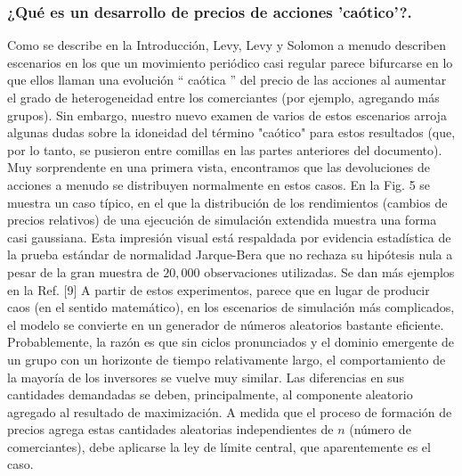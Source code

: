 \documentclass[12pt,a4paper]{article}
\begin{document}
\subsubsection*{¿Qué es un desarrollo de precios de acciones 'caótico'?.}
\quad Como se describe en la Introducción, Levy, Levy y Solomon a menudo describen escenarios en los que un movimiento periódico casi regular parece bifurcarse en lo que ellos llaman una evolución `` caótica '' del precio de las acciones al aumentar el grado de heterogeneidad entre los comerciantes (por ejemplo, agregando más grupos). Sin embargo, nuestro nuevo examen de varios de estos escenarios arroja algunas dudas sobre la idoneidad del término "caótico" para estos resultados (que, por lo tanto, se pusieron entre comillas en las partes anteriores del documento). Muy sorprendente en una primera vista, encontramos que las devoluciones de acciones a menudo se distribuyen normalmente en estos casos. En la Fig. 5 se muestra un caso típico, en el que la distribución de los rendimientos (cambios de precios relativos) de una ejecución de simulación extendida muestra una forma casi gaussiana. Esta impresión visual está respaldada por evidencia estadística de la prueba estándar de normalidad Jarque-Bera que no rechaza su hipótesis nula a pesar de la gran muestra de $ 20,000 $ observaciones utilizadas. Se dan más ejemplos en la Ref. [9] A partir de estos experimentos, parece que en lugar de producir caos (en el sentido matemático), en los escenarios de simulación más complicados, el modelo se convierte en un generador de números aleatorios bastante eficiente. Probablemente, la razón es que sin ciclos pronunciados y el dominio emergente de un grupo con un horizonte de tiempo relativamente largo, el comportamiento de la mayoría de los inversores se vuelve muy similar. Las diferencias en sus cantidades demandadas se deben, principalmente, al componente aleatorio agregado al resultado de maximización. A medida que el proceso de formación de precios agrega estas cantidades aleatorias independientes de $ n $ (número de comerciantes), debe aplicarse la ley de límite central, que aparentemente es el caso.
\end{document}
